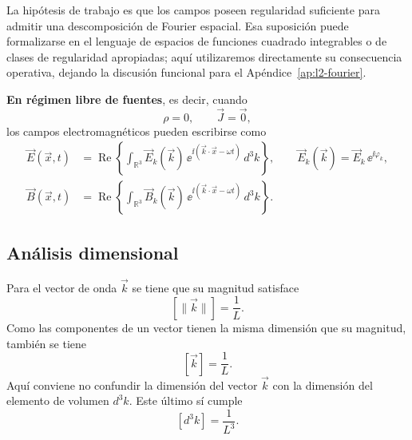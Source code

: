 \documentclass[../main.tex]{subfiles}
\begin{document}
La hipótesis de trabajo es que los campos poseen regularidad suficiente para admitir una descomposición de Fourier espacial. Esa suposición puede formalizarse en el lenguaje de espacios de funciones cuadrado integrables o de clases de regularidad apropiadas; aquí utilizaremos directamente su consecuencia operativa, dejando la discusión funcional para el Apéndice~\ref{ap:l2-fourier}.

\textbf{En régimen libre de fuentes}, es decir, cuando
\begin{equation*}
    \rho=0,
    \qquad
    \vec J=\vec 0,
\end{equation*}
los campos electromagnéticos pueden escribirse como
\begin{align}
    \vec E(\vec x,t)&=\operatorname{Re}\left\{
        \int_{\mathbb R^3}\vec E_k(\vec k)\,\ee^{\ii(\vec k\cdot\vec x-\omega t)}\,d^3k
    \right\},
    \qquad
    \vec E_k(\vec k)=\vec E_k\,\ee^{\ii\varphi_k},
    \label{eq:campo-E-espectral}\\
    \vec B(\vec x,t)&=\operatorname{Re}\left\{
        \int_{\mathbb R^3}\vec B_k(\vec k)\,\ee^{\ii(\vec k\cdot\vec x-\omega t)}\,d^3k
    \right\}.
    \label{eq:campo-B-espectral}
\end{align}

\subsection{Análisis dimensional}

Para el vector de onda $\vec k$ se tiene que su magnitud satisface
\begin{equation*}
    \left[\|\vec k\|\right]=\frac{1}{L}.
\end{equation*}
Como las componentes de un vector tienen la misma dimensión que su magnitud, también se tiene
\begin{equation*}
    \left[\vec k\right]=\frac{1}{L}.
\end{equation*}
Aquí conviene no confundir la dimensión del vector $\vec k$ con la dimensión del elemento de volumen $d^3k$. Este último sí cumple
\begin{equation*}
    \left[d^3k\right]=\frac{1}{L^3}.
\end{equation*}
\end{document}
